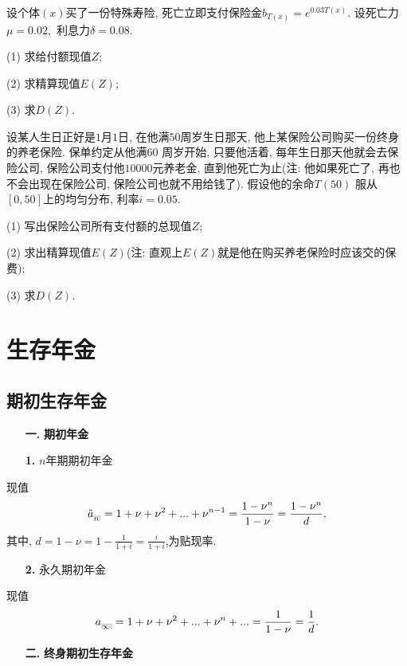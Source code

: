 \documentclass[a4paper,openany, 10pt]{ctexbook}
\makeatletter
\newcommand{\hei}{\CJKfamily{hei}}      %
\DeclareRobustCommand{\annu}[1]{_{%
    \def\arraystretch{0}%
    \setlength\arraycolsep{1pt}%
    \setlength\arrayrulewidth{.2pt}%
    \begin{array}[b]{@{}c|}\hline
        \\[\arraycolsep]%
        \scriptstyle #1%
    \end{array}%
}}
\makeatother
\begin{document}
\begin{exs}
    设个体$(x)$买了一份特殊寿险, 死亡立即支付保险金$b_{T(x)}=e^{0.03T(x)}.$ 设死亡力$\mu=0.02,$ 利息力$\delta=0.08.$

    (1) 求给付额现值$Z;$

    (2) 求精算现值$E(Z);$

    (3) 求$D(Z).$
\end{exs}

\begin{exs}
    设某人生日正好是$1$月$1$日, 在他满$50$周岁生日那天, 他上某保险公司购买一份终身的养老保险. 保单约定从他满$60$ 周岁开始, 只要他活着, 每年生日那天他就会去保险公司, 保险公司支付他$10000$元养老金, 直到他死亡为止(注: 他如果死亡了, 再也不会出现在保险公司, 保险公司也就不用给钱了). 假设他的余命$T(50)$ 服从$[0,50]$上的均匀分布, 利率$i=0.05.$

    (1) 写出保险公司所有支付额的总现值$Z$;

    (2) 求出精算现值$E(Z)$(注: 直观上$E(Z)$就是他在购买养老保险时应该交的保费);

    (3) 求$D(Z).$
\end{exs}


\chapter{生存年金}
\section{期初生存年金}
\begin{itemize}
    \item[{\bf\hei 一.}]{\bf\hei 期初年金}
\end{itemize}

\begin{itemize}
    \item[{\bf\hei 1.}]$n$年期期初年金
\end{itemize}

\noindent 现值$$\ddot a_{\annu n}=1+\nu+\nu^2+...+\nu^{n-1}=\frac{1-\nu^n}{1-\nu}=\frac{1-\nu^n}{d},$$
其中, $d=1-\nu=1-\frac{1}{1+i}=\frac{i}{1+i}$,为贴现率.
\begin{itemize}
    \item[{\bf\hei 2.}]永久期初年金
\end{itemize}
现值$$a_{\annu {\infty}}=1+\nu+\nu^2+...+\nu^n+...=\frac{1}{1-\nu}=\frac{1}{d}.$$
\begin{itemize}
    \item[{\bf\hei 二.}]{\bf\hei 终身期初生存年金}
\end{itemize}
\end{document}

